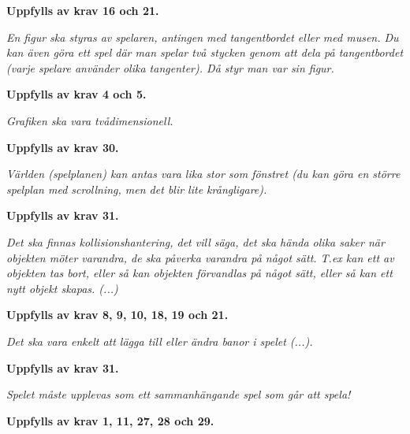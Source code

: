 \documentclass{TDP005mall}
\begin{document}
\textbf{Uppfylls av krav 16 och 21.}

\textit{En figur ska styras av spelaren, antingen med tangentbordet eller med musen. Du kan även göra ett spel där man spelar två stycken genom att dela på tangentbordet (varje spelare använder olika tangenter). Då styr man var sin figur.}

\textbf{Uppfylls av krav 4 och 5.}

\textit{Grafiken ska vara tvådimensionell.}

\textbf{Uppfylls av krav 30.}

\textit{Världen (spelplanen) kan antas vara lika stor som fönstret (du kan göra en större spelplan med scrollning, men det blir lite krångligare).}

\textbf{Uppfylls av krav 31.}

\textit{Det ska finnas kollisionshantering, det vill säga, det ska hända olika saker när objekten möter varandra, de ska påverka varandra på något sätt. T.ex kan ett av objekten tas bort, eller så kan objekten förvandlas på något sätt, eller så kan ett nytt objekt skapas. (...)}

\textbf{Uppfylls av krav 8, 9, 10, 18, 19 och 21.}

\textit{Det ska vara enkelt att lägga till eller ändra banor i spelet (...).}

\textbf{Uppfylls av krav 31.}

\textit{Spelet måste upplevas som ett sammanhängande spel som går att spela!}

\textbf{Uppfylls av krav 1, 11, 27, 28 och 29.}
\end{document}
